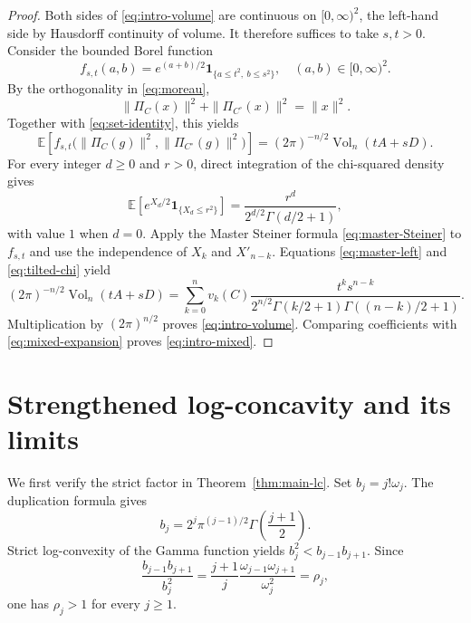 \documentclass[12pt,a4paper]{article}
\numberwithin{equation}{section}
\theoremstyle{definition}
\theoremstyle{remark}
\newcommand{\E}{\mathbb{E}}
\newcommand{\vol}{\operatorname{Vol}}
\begin{document}
\begin{proof}
Both sides of \eqref{eq:intro-volume} are continuous on $[0,\infty)^2$, the left-hand side by Hausdorff continuity of volume. It therefore suffices to take $s,t>0$. Consider the bounded Borel function
\[
 f_{s,t}(a,b)=e^{(a+b)/2}\mathbf 1_{\{a\le t^2,\ b\le s^2\}}, \quad (a,b)\in[0,\infty)^2.
\]
By the orthogonality in \eqref{eq:moreau},
\[
 \|\Pi_C(x)\|^2+\|\Pi_{C^\circ}(x)\|^2=\|x\|^2.
\]
Together with \eqref{eq:set-identity},  this yields
\begin{equation}\label{eq:master-left}
 \E\!\left[f_{s,t}\bigl(\|\Pi_C(g)\|^2, \|\Pi_{C^\circ}(g)\|^2\bigr)\right]=(2\pi)^{-n/2}\vol_n(tA+sD).
\end{equation}
For every integer $d\ge0$ and $r>0$, direct integration of the chi-squared density gives
\begin{equation}\label{eq:tilted-chi}
 \E\left[e^{X_d/2}\mathbf 1_{\{X_d\le r^2\}}\right]
 =\frac{r^d}{2^{d/2}\Gamma(d/2+1)},
\end{equation}
with value $1$ when $d=0$.  Apply the Master Steiner formula \eqref{eq:master-Steiner} to $f_{s,t}$ and use the independence of $X_k$ and $X'_{n-k}$.  Equations \eqref{eq:master-left} and
\eqref{eq:tilted-chi} yield
\[
 (2\pi)^{-n/2}\vol_n(tA+sD)=\sum_{k=0}^n v_k(C)\frac{t^ks^{n-k}}{2^{n/2}\Gamma(k/2+1)\Gamma((n-k)/2+1)}.
\]
Multiplication by $(2\pi)^{n/2}$ proves
\eqref{eq:intro-volume}.  Comparing coefficients with
\eqref{eq:mixed-expansion} proves \eqref{eq:intro-mixed}.
\end{proof}
\section{Strengthened log-concavity and its limits}\label{sec:refined}

We first verify the strict factor in Theorem~\ref{thm:main-lc}.  Set
$b_j=j!\omega_j$.  The duplication formula gives
\[
 b_j=2^j\pi^{(j-1)/2}
 \Gamma\left(\frac{j+1}{2}\right).
\]
Strict log-convexity of the Gamma function yields
$b_j^2<b_{j-1}b_{j+1}$.  Since
\[
 \frac{b_{j-1}b_{j+1}}{b_j^2}
 =\frac{j+1}{j}
  \frac{\omega_{j-1}\omega_{j+1}}{\omega_j^2}
 =\rho_j,
\]
one has $\rho_j>1$ for every $j\ge1$.
\end{document}
